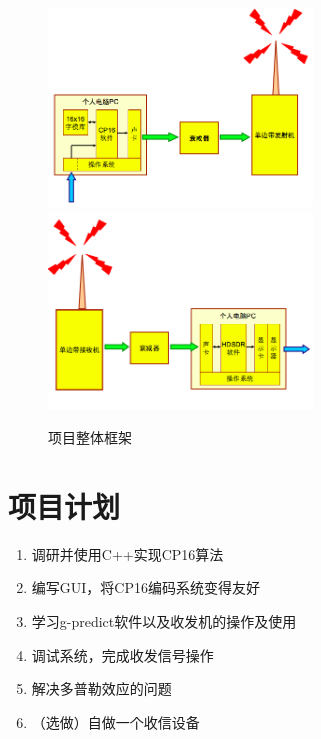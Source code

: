 \documentclass[UTF8, a4paper]{ctexart}
\begin{document}
      \begin{figure}[H]
       \centering
       \includegraphics[width=7cm]{figure/system-trans.png}
       \includegraphics[width=7cm]{figure/system-rece.png}
     \caption{项目整体框架}
   \end{figure}
  
  \newpage
  \section{项目计划}
  \begin{enumerate}
    \item 调研并使用C++实现CP16算法
    \item 编写GUI，将CP16编码系统变得友好
    \item 学习g-predict软件以及收发机的操作及使用
    \item 调试系统，完成收发信号操作
    \item 解决多普勒效应的问题
    \item （选做）自做一个收信设备
  \end{enumerate}



  
  
\end{document}
